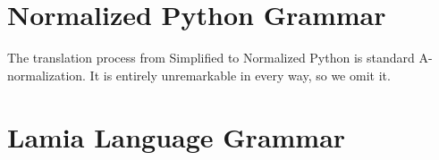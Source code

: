 \documentclass{article}
\begin{document}
\section{Normalized Python Grammar}
\begin{grammar}
  \grule[variables]{\pvariable}{}
  \grule[suites]{\psuite}{\gtobrk \pstmt; \ldots \gtcbrk}
  \grule[statements]{\pstmt}{
              \gtreturn \pvariable \gline
      \gor    \pvariable \gteq \pexpr \gline
      \gor    \gtwhile \pvariable \gtcolon \psuite \gline
      \gor    \gtif \pvariable \gtcolon \psuite \gtelse \gtcolon \psuite \gline
      \gor    \gtraise \pvariable \gline
      \gor    \gttry \gtcolon \psuite \gtexcept \pvariable \gtcolon \psuite \gline
      \gor    \gtpass \gline
      \gor    \gtbreak \gline
      \gor    \gtcontinue \gline
  }
  \grule[numbers]{\pnum}{}
\end{grammar}

The translation process from Simplified to Normalized Python is standard A-normalization.
It is entirely unremarkable in every way, so we omit it.

\section{Lamia Language Grammar}
\end{document}
